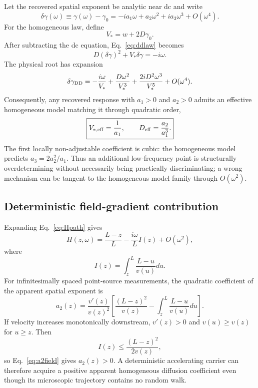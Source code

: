 \documentclass[aps,pra,twocolumn,superscriptaddress,nofootinbib]{revtex4-2}
\newcommand{\Deff}{D_{\mathrm{eff}}}
\begin{document}
Let the recovered spatial exponent be analytic near dc and write
\begin{equation}
\delta\gamma(\omega)
\equiv\gamma(\omega)-\gamma_0
=-ia_1\omega+a_2\omega^2+ia_3\omega^3+O(\omega^4).
\label{eq:gammaexpansion}
\end{equation}
For the homogeneous law, define
\begin{equation}
V_*=w+2D\gamma_0.
\end{equation}
After subtracting the dc equation, Eq.~\eqref{eq:ddlaw} becomes
\begin{equation}
D(\delta\gamma)^2+V_*\delta\gamma=-i\omega.
\end{equation}
The physical root has expansion
\begin{equation}
\delta\gamma_{\rm DD}
=-\frac{i\omega}{V_*}
+\frac{D\omega^2}{V_*^3}
+\frac{2iD^2\omega^3}{V_*^5}
+O(\omega^4).
\label{eq:ddexpansion}
\end{equation}
Consequently, any recovered response with $a_1>0$ and $a_2>0$ admits an effective homogeneous model matching it through quadratic order,
\begin{equation}
\boxed{
V_{*,\rm eff}=\frac{1}{a_1},
\qquad
\Deff=\frac{a_2}{a_1^3}.
}
\label{eq:effectiveD}
\end{equation}
The first locally non-adjustable coefficient is cubic: the homogeneous model predicts $a_3=2a_2^2/a_1$. Thus an additional low-frequency point is structurally overdetermining without necessarily being practically discriminating; a wrong mechanism can be tangent to the homogeneous model family through $O(\omega^2)$.

\subsection{Deterministic field-gradient contribution}

Expanding Eq.~\eqref{eq:Hpath} gives
\begin{equation}
H(z,\omega)=\frac{L-z}{L}
-\frac{i\omega}{L}I(z)+O(\omega^2),
\end{equation}
where
\begin{equation}
I(z)=\int_z^L\frac{L-u}{v(u)}du.
\end{equation}
For infinitesimally spaced point-source measurements, the quadratic coefficient of the apparent spatial exponent is
\begin{equation}
\boxed{
a_2(z)=
\frac{v'(z)}{v(z)^2}
\left[
\frac{(L-z)^2}{v(z)}-
\int_z^L\frac{L-u}{v(u)}du
\right].
}
\label{eq:a2field}
\end{equation}
If velocity increases monotonically downstream, $v'(z)>0$ and $v(u)\ge v(z)$ for $u\ge z$. Then
\begin{equation}
I(z)\le\frac{(L-z)^2}{2v(z)},
\end{equation}
so Eq.~\eqref{eq:a2field} gives $a_2(z)>0$. A deterministic accelerating carrier can therefore acquire a positive apparent homogeneous diffusion coefficient even though its microscopic trajectory contains no random walk.
\end{document}
